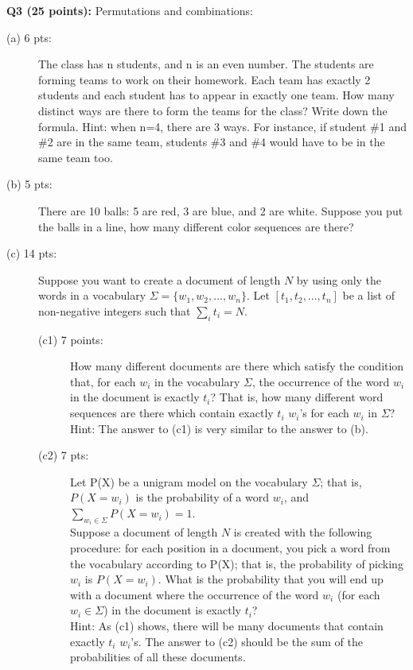 \documentclass[11pt]{article}
\begin{document}
\vspace{0.3 in}
\hspace{-0.3in}
{\bf Q3 (25 points):} Permutations and combinations:
   \begin{description}
     \item [(a) 6 pts:] The class has n students, and n is an even number.
        The students are forming teams to work on their homework. Each team
        has exactly 2 students and each student has to appear in exactly one 
        team. How many distinct ways are there to form the teams
        for the class? Write down the formula. Hint: when n=4, there are 3 ways.
        For instance, if student \#1 and \#2 are in the same team, 
        students \#3 and \#4 would have to be in the same team too.


     \item [(b) 5 pts:] There are 10 balls: 
    5 are red, 3 are blue, and 2 are white. 
    Suppose you put the balls in a line, 
    how many different color sequences are there?
    
     \item [(c) 14 pts:] Suppose you want to create a document of 
        length $N$ by using only the words in a vocabulary 
        $\Sigma=\{w_1, w_2, ..., w_n\}$. Let $[t_1, t_2, ..., t_n]$
        be a list of non-negative integers such that $\sum_i t_i = N$.
       \begin{description}
         \item [(c1) 7 points:] 
        How many different documents are there which satisfy
       the condition that, 
       for each $w_i$ in the vocabulary $\Sigma$, the occurrence of the word
       $w_i$ in the document is exactly $t_i$? That is,
      how many different word sequences are there which contain 
      exactly $t_i$ $w_i$'s for each $w_i$ in $\Sigma$? \\

      Hint: The answer to (c1) is very similar to the answer to (b). \\
 
    \item [(c2) 7 pts:] Let P(X) be a unigram model on the vocabulary $\Sigma$;
      that is, $P(X=w_i)$ is the probability of a word $w_i$,
      and $\sum_{w_i \in \Sigma} P(X=w_i)=1$. \\
      
      Suppose a document of length $N$ is created with 
        the following procedure: for each position in a document,
        you pick a word from the vocabulary according to P(X);
        that is, the probability of picking $w_i$ is $P(X=w_i)$. 
        What is the probability that you will end up with a document where
         the occurrence of the word $w_i$ (for each $w_i \in \Sigma$)
         in the document is exactly $t_i$? \\

         Hint: As (c1) shows, there will be many 
         documents that contain exactly $t_i$ $w_i$'s. The answer to (c2) should
         be the sum of the probabilities of all these documents.
      \end{description}
 
  \end{description}
\end{document}

